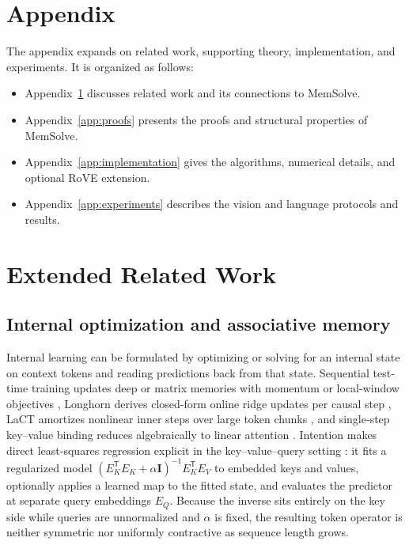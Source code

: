 \documentclass[10pt,twocolumn]{article}
\newcommand{\I}{\mathbf{I}}
\newcommand{\T}{\mathsf{T}}
\begin{document}
\FloatBarrier
\begingroup
\raggedright
\let\draftbibliography\thebibliography
\renewcommand{\thebibliography}[1]{%
  \draftbibliography{#1}\setlength{\itemsep}{2pt}}


\endgroup

\onecolumn
\appendix
\section*{Appendix}
The appendix expands on related work, supporting theory, implementation,
and experiments. It is organized as follows:
\begin{itemize}
\item Appendix~\ref{app:related} discusses related work and its connections to MemSolve.
\item Appendix~\ref{app:proofs} presents the proofs and structural properties of MemSolve.
\item Appendix~\ref{app:implementation} gives the algorithms, numerical details, and optional RoVE extension.
\item Appendix~\ref{app:experiments} describes the vision and language protocols and results.
\end{itemize}
\section{Extended Related Work}
\label{app:related}

\subsection{Internal optimization and associative memory}

Internal learning can be formulated by optimizing or solving for an internal
state on context tokens and reading predictions back from that state.
Sequential test-time training updates deep or matrix memories with momentum or
local-window objectives \cite{sun2025ttt,behrouz2025titans,behrouz2026atlas},
Longhorn derives closed-form online ridge updates per causal step
\cite{liu2024longhorn}, LaCT amortizes nonlinear inner steps over large token
chunks \cite{zhang2026lact}, and single-step key--value binding reduces
algebraically to linear attention \cite{liu2026kvbinding}.
Intention makes direct least-squares regression explicit in the
key--value--query setting \cite{garnelo2023intention}: it fits a regularized
model $(E_K^\T E_K+\alpha\I)^{-1}E_K^\T E_V$ to embedded keys and values,
optionally applies a learned map to the fitted state, and evaluates the
predictor at separate query embeddings $E_Q$.
Because the inverse sits entirely on the key side while queries are
unnormalized and $\alpha$ is fixed, the resulting token operator is neither
symmetric nor uniformly contractive as sequence length grows.
\end{document}

